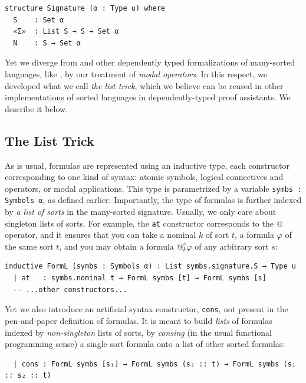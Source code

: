 \documentclass{easychair}
\theoremstyle{remark}
\begin{document}
\begin{lstlisting}
structure Signature (α : Type u) where
  S    : Set α
  «Σ»  : List S → S → Set α
  N    : S → Set α
\end{lstlisting}

Yet we diverge from \cite{gunther2018formalization} and other dependently typed formalizations of many-sorted languages, like \cite{depmatching}, by our treatment of \textit{modal operators}. In this respect, we developed what we call \textit{the list trick}, which we believe can be reused in other implementations of sorted languages in dependently-typed proof assistants. We describe it below.

\subsection{The List Trick}

As is usual, formulas are represented using an inductive type, each constructor corresponding to one kind of syntax: atomic symbols, logical connectives and operators, or modal applications. This type is parametrized by a variable \lstinline{symbs : Symbols α}, as defined earlier. Importantly, the type of formulas is further indexed by \textit{a list of sorts} in the many-sorted signature. Usually, we only care about singleton lists of sorts. For example, the \lstinline{at} constructor corresponds to the $@$ operator, and it ensures that you can take a nominal $k$ of sort $t$, a formula $\varphi$ of the same sort $t$, and you may obtain a formula $@_k^s \varphi$ of any arbitrary sort $s$:

\begin{lstlisting}
inductive FormL (symbs : Symbols α) : List symbs.signature.S → Type u
  | at   : symbs.nominal t → FormL symbs [t] → FormL symbs [s]
  -- ...other constructors...
\end{lstlisting}

Yet we also introduce an artificial syntax constructor, \lstinline{cons}, not present in the pen-and-paper definition of formulas. It is meant to build \textit{lists} of formulas indexed by \textit{non-singleton} lists of sorts, by \textit{consing} (in the usual functional programming sense) a single sort formula onto a list of other sorted formulas:

\begin{lstlisting}
  | cons : FormL symbs [s₁] → FormL symbs (s₂ :: t) → FormL symbs (s₁ :: s₂ :: t)
\end{lstlisting}
\end{document}
